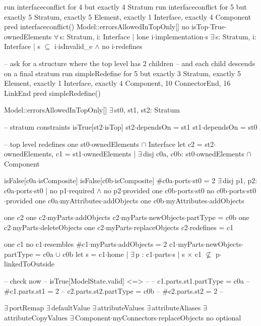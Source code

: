 run interfaceconflict for 4 but exactly 4 Stratum
run interfaceconflict for 5 but exactly 5 Stratum, exactly 5 Element, exactly 1 Interface, exactly 4 Component
pred interfaceconflict()
{
  Model::errorsAllowedInTopOnly[]
  no isTop$\cdot$True$\cdot$ownedElements
  $\forall\,$s: Stratum, i: Interface | lone i$\cdot$implementation$\cdot$s
  $\exists\,$s: Stratum, i: Interface |
    s $\subseteq$ i$\cdot$isInvalid_e $\wedge$ no i$\cdot$redefines
}


-- ask for a structure where the top level has 2 children
-- and each child descends on a final stratum
run simpleRedefine for 5 but exactly 3 Stratum, exactly 5 Element, exactly 1 Interface, exactly 4 Component, 10 ConnectorEnd, 16 LinkEnd
pred simpleRedefine()
{
  Model::errorsAllowedInTopOnly[]
  $\exists\,$st0, st1, st2: Stratum
  {
    -- stratum constraints
    isTrue[st2$\cdot$isTop]
    st2$\cdot$dependsOn = st1
    st1$\cdot$dependsOn = st0

    -- top level redefines
    one st0$\cdot$ownedElements $\cap$ Interface
    let
      c2 = st2$\cdot$ownedElements,
      c1 = st1$\cdot$ownedElements |
    $\exists\,$disj c0a, c0b: st0$\cdot$ownedElements $\cap$ Component
    {
      isFalse[c0a$\cdot$isComposite]
      isFalse[c0b$\cdot$isComposite]
      #c0a$\cdot$ports$\cdot$st0 = 2
      $\exists\,$disj p1, p2: c0a$\cdot$ports$\cdot$st0 |
        no p1$\cdot$required $\wedge$ no p2$\cdot$provided
      one c0b$\cdot$ports$\cdot$st0
      no c0b$\cdot$ports$\cdot$st0$\cdot$provided
      one c0a$\cdot$myAttributes$\cdot$addObjects
      one c0b$\cdot$myAttributes$\cdot$addObjects
      
      one c2
      one c2$\cdot$myParts$\cdot$addObjects
      c2$\cdot$myParts$\cdot$newObjects$\cdot$partType = c0b
      one c2$\cdot$myParts$\cdot$deleteObjects
      one c2$\cdot$myParts$\cdot$replaceObjects
      c2$\cdot$redefines = c1
      
      one c1
      no c1$\cdot$resembles
      #c1$\cdot$myParts$\cdot$addObjects = 2
      c1$\cdot$myParts$\cdot$newObjects$\cdot$partType = c0a $\cup$ c0b
      let s = c1$\cdot$home |
      $\exists\,$p : c1$\cdot$parts$\cdot$s |
        s$\,\times\,$c1 $\not\subseteq$ p$\cdot$linkedToOutside
      
      -- check now
--      isTrue[ModelState.valid] <=>
--      {
--        c1.parts.st1.partType = c0a
--        #c1.parts.st1 = 2
--        c2.parts.st2.partType = c0b
--        #c2.parts.st2 = 2
--      }
    }
  }

  $\exists\,$portRemap
  $\exists\,$defaultValue
  $\exists\,$attributeValues
  $\exists\,$attributeAliases
  $\exists\,$attributeCopyValues
  $\exists\,$Component$\cdot$myConnectors$\cdot$replaceObjects
  no optional
}

